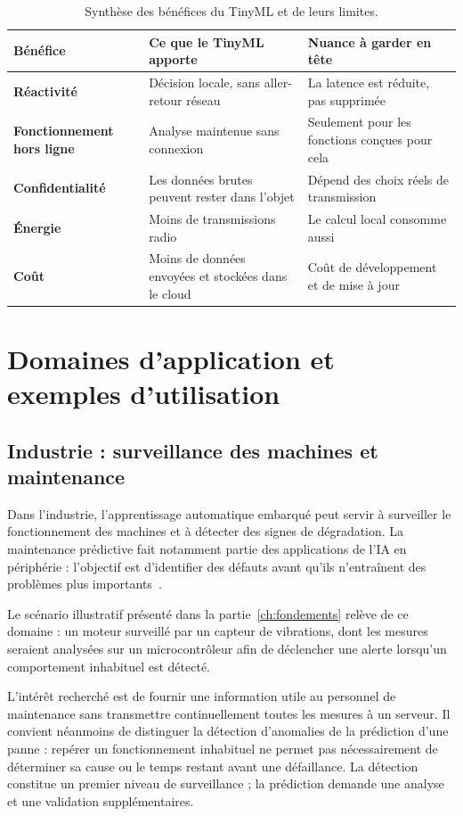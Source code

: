 \begin{table}[H]
\centering
\small
\begin{tabularx}{\linewidth}{>{\bfseries}l X X}
\toprule
Bénéfice & Ce que le TinyML apporte & Nuance à garder en tête \\
\midrule
Réactivité      & Décision locale, sans aller-retour réseau & La latence est réduite, pas supprimée \\
Fonctionnement hors ligne & Analyse maintenue sans connexion & Seulement pour les fonctions conçues pour cela \\
Confidentialité & Les données brutes peuvent rester dans l'objet & Dépend des choix réels de transmission \\
Énergie         & Moins de transmissions radio & Le calcul local consomme aussi \\
Coût            & Moins de données envoyées et stockées dans le cloud & Coût de développement et de mise à jour \\
\bottomrule
\end{tabularx}
\caption{Synthèse des bénéfices du TinyML et de leurs limites.}
\label{tab:benefices}
\end{table}

\section{Domaines d'application et exemples d'utilisation}

\subsection{Industrie : surveillance des machines et maintenance}

Dans l'industrie, l'apprentissage automatique embarqué peut servir à surveiller
le fonctionnement des machines et à détecter des signes de dégradation. La
maintenance prédictive fait notamment partie des applications de l'IA en
périphérie : l'objectif est d'identifier des défauts avant qu'ils n'entraînent
des problèmes plus importants~\cite{zhang2021aiot}.

Le scénario illustratif présenté dans la partie~\ref{ch:fondements} relève de
ce domaine : un moteur surveillé par un capteur de vibrations, dont les mesures
seraient analysées sur un microcontrôleur afin de déclencher une alerte
lorsqu'un comportement inhabituel est détecté.

L'intérêt recherché est de fournir une information utile au personnel de
maintenance sans transmettre continuellement toutes les mesures à un serveur.
Il convient néanmoins de distinguer la détection d'anomalies de la prédiction
d'une panne : repérer un fonctionnement inhabituel ne permet pas nécessairement
de déterminer sa cause ou le temps restant avant une défaillance. La détection
constitue un premier niveau de surveillance ; la prédiction demande une analyse
et une validation supplémentaires.

